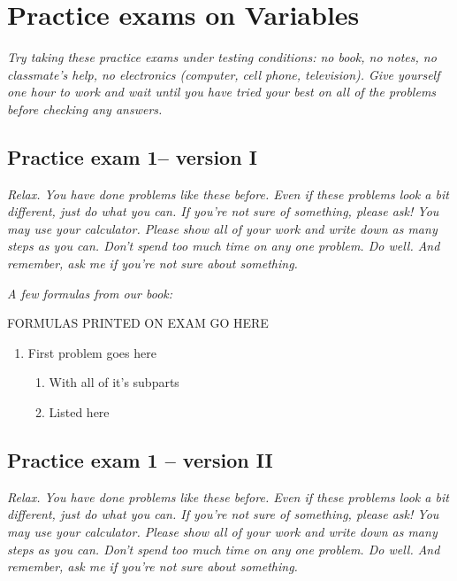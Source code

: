 
\section*{Practice exams on Variables}

\emph{Try taking these practice exams under testing conditions:  no book, no notes, no classmate's help, no electronics (computer, cell phone, television). Give yourself one hour to work and wait until you have tried your best on all of the problems before checking any answers.}
\bigskip

\subsection*{Practice exam 1-- version I}
\bigskip
 \emph{Relax.  You have done problems like these before.  Even if these problems look a bit different, just do what you can.  If you're not sure of something, please ask! You may use your calculator.  Please show all of your work and write down as many steps as you can.  Don't spend too much time on any one problem.  Do well.  And remember, ask me if you're not sure about something.}
 
\bigskip
 
\emph{A few formulas from our book:}

\begin{center}

FORMULAS PRINTED ON EXAM GO HERE

\end{center}

\hspace{-.25in} \hrulefill

\begin{enumerate}
\item First problem goes here
\begin{enumerate}
\item With all of it's subparts
\vfill
\item Listed here
\vfill
\end{enumerate}

\end{enumerate}

\newpage

\subsection*{Practice exam 1 -- version II}
\bigskip
 \emph{Relax.  You have done problems like these before.  Even if these problems look a bit different, just do what you can.  If you're not sure of something, please ask! You may use your calculator.  Please show all of your work and write down as many steps as you can.  Don't spend too much time on any one problem.  Do well.  And remember, ask me if you're not sure about something.}
 
